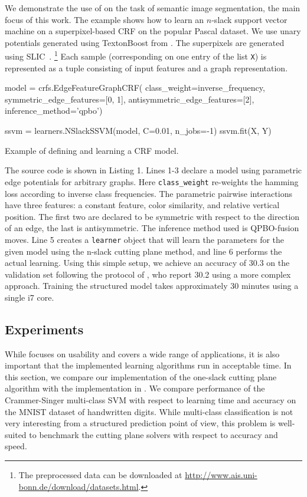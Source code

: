 We demonstrate the use of \pystruct on the task of semantic image segmentation,
the main focus of this work. The example shows how to learn an $n$-slack support
vector machine on a superpixel-based CRF on the popular Pascal dataset. We use
unary potentials generated using TextonBoost
from \citet{krahenbuhl2012efficient}. The superpixels are generated using SLIC~\citep{achanta2012slic}.%
\footnote{The preprocessed data can be downloaded at \url{http://www.ais.uni-bonn.de/download/datasets.html}.}
Each sample (corresponding on one entry of the list \texttt{X}) is represented as a
tuple consisting of input features and a graph representation.
\begin{listing}[t]
\begin{pythoncode}
model = crfs.EdgeFeatureGraphCRF(
            class_weight=inverse_frequency,
            symmetric_edge_features=[0, 1],
            antisymmetric_edge_features=[2],
            inference_method='qpbo')

ssvm = learners.NSlackSSVM(model, C=0.01, n_jobs=-1)
ssvm.fit(X, Y)
\end{pythoncode}
\caption{Example of defining and learning a CRF model.\label{lst:stuff}}
\end{listing}

The source code is shown in Listing 1.
Lines 1-3 declare a model using parametric edge potentials for arbitrary graphs.
Here \texttt{class\_weight} re-weights the hamming loss according to inverse class
frequencies. The parametric pairwise interactions have three features: a
constant feature, color similarity, and relative vertical position. The first two
are declared to be symmetric with respect to the direction of an edge, the last
is antisymmetric. The inference method used is QPBO-fusion moves.  Line 5
creates a \texttt{learner} object that will learn the parameters for the given
model using the n-slack cutting plane method, and line 6 performs the actual
learning.  Using this simple setup, we achieve an accuracy of 30.3 on the
validation set following the protocol of \citet{krahenbuhl2012efficient}, who
report 30.2 using a more complex approach. Training the structured model takes
approximately 30 minutes using a single i7 core.

\subsection{Experiments}\label{sec:benchmarks}
While \pystruct focuses on usability and covers a wide range of applications, it is also
important that the implemented learning algorithms run in acceptable time.
In this section, we compare our implementation of the one-slack cutting plane
algorithm with the implementation in \svmstruct.
We compare performance of the Crammer-Singer multi-class SVM with respect to
learning time and accuracy on the MNIST dataset of handwritten digits.
While multi-class classification is not very interesting from a structured
prediction point of view, this problem is well-suited to benchmark the cutting
plane solvers with respect to accuracy and speed.

